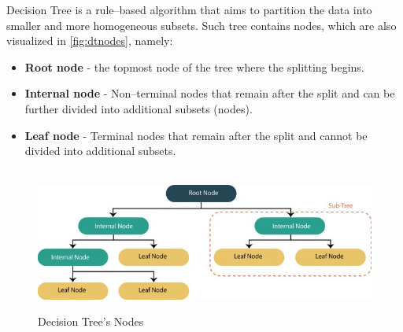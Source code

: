 Decision Tree is a rule--based algorithm that aims to partition the data into smaller and more homogeneous subsets. Such tree contains nodes, which are also visualized in \autoref{fig:dtnodes}, namely:
\begin{itemize}\setlength\itemsep{0em}
\item \textbf{Root node} - the topmost node of the tree where the splitting begins.
\item \textbf{Internal node} - Non--terminal nodes that remain after the split and can be further divided into additional subsets (nodes).
\item \textbf{Leaf node} - Terminal nodes that remain after the split and cannot be divided into additional subsets.
\end{itemize}
\begin{figure}[H]
    \centering
    \caption{Decision Tree's Nodes}\vspace{0.5em}
    \label{fig:dtnodes}\
    \includegraphics[width=130mm]{Figures/dtnodes.jpg}
    \vspace{-1em}
\end{figure}

